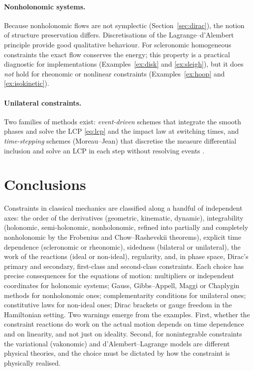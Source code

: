 \documentclass[11pt,a4paper]{article}
\theoremstyle{definition}
\theoremstyle{plain}
\theoremstyle{remark}
\begin{document}
\paragraph{Nonholonomic systems.}
Because nonholonomic flows are not symplectic (Section~\ref{sec:dirac}), the notion of
structure preservation differs. Discretisations of the Lagrange--d'Alembert principle
\cite{CortesMartinez2001} provide good qualitative behaviour. For scleronomic homogeneous
constraints the exact flow conserves the energy; this property is a practical diagnostic
for implementations (Examples~\ref{ex:disk} and \ref{ex:sleigh}), but it does \emph{not}
hold for rheonomic or nonlinear constraints (Examples~\ref{ex:hoop} and \ref{ex:isokinetic}).

\paragraph{Unilateral constraints.}
Two families of methods exist: \emph{event-driven} schemes that integrate the smooth phases
and solve the LCP \eqref{eq:lcp} and the impact law at switching times, and
\emph{time-stepping} schemes (Moreau--Jean) that discretise the measure differential
inclusion and solve an LCP in each step without resolving events
\cite{Moreau1988,Brogliato2016}.

\section{Conclusions}
\begingroup\sloppy
Constraints in classical mechanics are classified along a handful of independent axes:
the order of the derivatives (geometric, kinematic, dynamic), integrability
(holonomic, semi-holonomic, nonholonomic, refined into partially and completely nonholonomic by
the Frobenius and Chow--Rashevskii theorems), explicit time dependence
(scleronomic or rheonomic), sidedness (bilateral or unilateral), the work of the
reactions (ideal or non-ideal), regularity, and, in phase space, Dirac's
primary and secondary, first-class and second-class constraints. Each choice has precise consequences for
the equations of motion: multipliers or independent coordinates for holonomic systems; Gauss,
Gibbs--Appell, Maggi or Chaplygin methods for nonholonomic ones; complementarity conditions for
unilateral ones; constitutive laws for non-ideal ones; Dirac brackets or gauge freedom in the Hamiltonian
setting. Two warnings emerge from the examples. First, whether the constraint reactions do work on
the actual motion depends on time dependence and on linearity, and not just on
ideality. Second, for nonintegrable constraints the variational (vakonomic) and
d'Alembert--Lagrange models are different physical theories, and the choice must be
dictated by how the constraint is physically realised.
\endgroup
\end{document}
